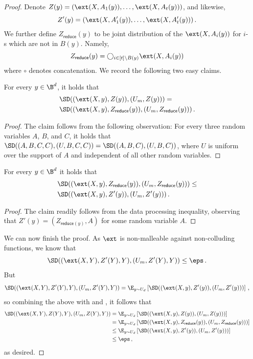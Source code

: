 \documentclass{toc}
\begin{document}
\begin{proof}
Denote $Z(y) = ( \ext(X,A_{1}(y)),\ldots,\ext(X,A_{t}(y)) )$, and likewise,
\[Z'(y) = ( \ext(X,A'_{1}(y)),\ldots,\ext(X,A'_{t}(y)) )\,.\] We further
define $Z_{\mathsf{reduce}}(y)$ to be joint distribution of the $\ext(X,A_i(y))$ for $i$-s which
are not in $B(y)$. Namely,
\[
Z_{\mathsf{reduce}}(y) = \bigcirc_{i \in [t] \setminus B(y)} \ext(X,A_{i}(y))
\]
where $\circ$ denotes concatenation. 
We record the following two easy claims.
\begin{claim}\label{claim:sec41}
For every $y \in \B^d$,
it holds that
\begin{align*}
&\SD((\ext(X,y),Z(y)),(U_m,Z(y))) =  \\ &\SD((\ext(X,y),Z_{\mathsf{reduce}}(y)),(U_m,Z_{\mathsf{reduce}}(y)))\,.
\end{align*}
\end{claim}
\begin{proof}
The claim follows from the following observation: For every three random variables $A$, $B$, and $C$,
it holds that $\SD((A,B,C,C),(U,B,C,C)) = \SD((A,B,C),(U,B,C))$, where $U$ is uniform over the support of
$A$ and independent of all other random variables.
\end{proof}

\begin{claim}\label{claim:sec42}
For every $y \in \B^d$ it holds that
\begin{align*}
&\SD((\ext(X,y),Z_{\mathsf{reduce}}(y)),(U_m,Z_{\mathsf{reduce}}(y))) \le \\
&\SD((\ext(X,y),Z'(y)),(U_m,Z'(y)))\,.
\end{align*}
\end{claim}
\begin{proof}
The claim readily follows from the data processing inequality, observing that
$Z'(y) = (Z_{\mathsf{reduce}(y)},A)$ for some random variable $A$.
\end{proof}

We can now finish the proof. As $\ext$ is non-malleable against non-colluding functions,
we know that
\[
\SD((\ext(X,Y),Z'(Y),Y),(U_m,Z'(Y),Y)) \le \eps\,.
\]
But
\[
\SD((\ext(X,Y),Z'(Y),Y),(U_m,Z'(Y),Y))  = \E_{y \sim U_d}\left[ \SD((\ext(X,y),Z'(y)),(U_m,Z'(y))) \right]\,,
\]
so
combining the above with  and , it follows that
\begin{align*}
\SD((\ext(X,Y),Z(Y),Y),(U_m,Z(Y),Y)) &= \E_{y \sim U_d}\left[ \SD((\ext(X,y),Z(y)),(U_m,Z(y))) \right] \\
&= \E_{y \sim U_d}\left[ \SD((\ext(X,y),Z_{\mathsf{reduce}}(y)),(U_m,Z_{\mathsf{reduce}}(y))) \right] \\
&\le \E_{y \sim U_d}\left[ \SD((\ext(X,y),Z'(y)),(U_m,Z'(y))) \right] \\
&\le \eps\,,
\end{align*}
as desired. 
\end{proof}
\end{document}
